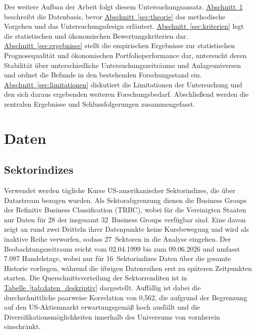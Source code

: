 \documentclass[a4paper, 12pt]{article}
\begin{document}
Der weitere Aufbau der Arbeit folgt diesem Untersuchungsansatz.
\hyperref[sec:daten]{Abschnitt~\ref*{sec:daten}} beschreibt die Datenbasis, bevor \hyperref[sec:theorie]{Abschnitt~\ref*{sec:theorie}} das methodische Vorgehen und das Untersuchungsdesign erläutert.
\hyperref[sec:kriterien]{Abschnitt~\ref*{sec:kriterien}} legt die statistischen und ökonomischen Bewertungskriterien dar.
\hyperref[sec:ergebnisse]{Abschnitt~\ref*{sec:ergebnisse}} stellt die empirischen Ergebnisse zur statistischen Prognosequalität und ökonomischen Portfolioperformance dar, untersucht deren Stabilität über unterschiedliche Untersuchungszeiträume und Anlageuniversen und ordnet die Befunde in den bestehenden Forschungsstand ein.
\hyperref[sec:limitationen]{Abschnitt~\ref*{sec:limitationen}} diskutiert die Limitationen der Untersuchung und den sich daraus ergebenden weiteren Forschungsbedarf.
Abschließend werden die zentralen Ergebnisse und Schlussfolgerungen zusammengefasst.

\section{Daten}\label{sec:daten}
\subsection{Sektorindizes}\label{sec:sektorindizes}
Verwendet werden tägliche Kurse US-amerikanischer Sektorindizes, die über Datastream bezogen wurden.
Als Sektorabgrenzung dienen die Business Groups der Refinitiv Business Classification (TRBC), wobei für die Vereinigten Staaten nur Daten für 28 der insgesamt 32~Business Groups verfügbar sind.
Eine davon zeigt an rund zwei Dritteln ihrer Datenpunkte keine Kursbewegung und wird als inaktive Reihe verworfen, sodass 27~Sektoren in die Analyse eingehen.
Der Beobachtungszeitraum reicht vom 02.04.1999 bis zum 09.06.2026 und umfasst 7.087 Handelstage, wobei nur für 16~Sektorindizes Daten über die gesamte Historie vorliegen, während die übrigen Datenreihen erst zu späteren Zeitpunkten starten.
Die Querschnittsverteilung der Sektorrenditen ist in \hyperref[tab:daten_deskriptiv]{Tabelle~\ref*{tab:daten_deskriptiv}} dargestellt.
Auffällig ist dabei die durchschnittliche paarweise Korrelation von 0,562, die aufgrund der Begrenzung auf den US-Aktienmarkt erwartungsgemäß hoch ausfällt und die Diversifikationsmöglichkeiten innerhalb des Universums von vornherein einschränkt.

\end{document}
